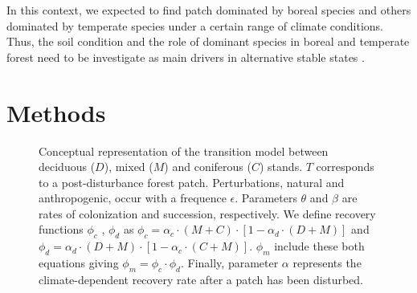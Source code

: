 
In this context, we expected to find patch dominated by boreal species and
others dominated by temperate species under a certain range of climate
conditions. Thus, the soil condition and the role of dominant species in
boreal and temperate forest need to be investigate as main drivers in
alternative stable states
\cite{Kellman2004,Moore2008,DeFrenne2013,Barras1998}.


\section{Methods}   

\begin{figure}
	
	\caption{Conceptual representation of the transition model between deciduous ($D$),
	mixed ($M$) and coniferous ($C$) stands. $T$ corresponds to a post-disturbance forest patch. Perturbations, natural and anthropogenic, occur with a frequence $\epsilon$. Parameters $\theta$ and $\beta$ are rates of colonization and succession,
	respectively. We define recovery functions $\phi_c$ , $\phi_d$ as $\phi_c
	= \alpha_c \cdot (M+C) \cdot [1- \alpha_d \cdot (D+M)]$ and $\phi_d =
	\alpha_d \cdot (D+M) \cdot [1- \alpha_c \cdot (C+M)]$. $\phi_m$ include these both equations giving $\phi_m = \phi_c \cdot \phi_d$. Finally, parameter $\alpha$ represents the climate-dependent recovery rate after a patch has been disturbed.}
	\label{Model}
	\vspace{-1em}
\end{figure}


